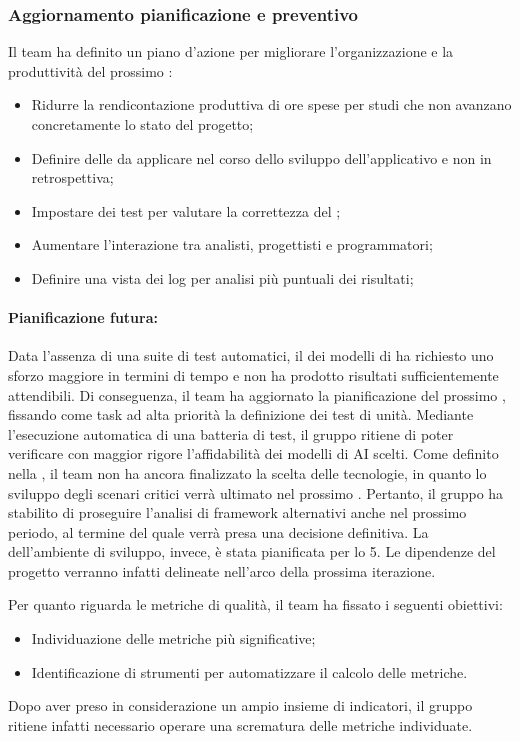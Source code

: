 \subsubsection{Aggiornamento pianificazione e preventivo}
\par Il team ha definito un piano d'azione per migliorare l'organizzazione e la produttività del prossimo :
\begin{itemize}
  \item Ridurre la rendicontazione produttiva di ore spese per studi che non avanzano concretamente lo stato del progetto;
  \item Definire delle  da applicare nel corso dello sviluppo dell'applicativo e non in retrospettiva;
  \item Impostare dei test per valutare la correttezza del ;
  \item Aumentare l'interazione tra analisti, progettisti e programmatori;
  \item Definire una vista dei log per analisi più puntuali dei risultati;
\end{itemize}

\paragraph*{Pianificazione futura:}
Data l'assenza di una suite di test automatici, il  dei modelli di  ha richiesto uno sforzo maggiore in termini di tempo e non ha prodotto risultati sufficientemente attendibili. Di conseguenza, il team ha aggiornato la pianificazione del prossimo , fissando come task ad alta priorità la definizione dei test di unità. Mediante l'esecuzione automatica di una batteria di test, il gruppo ritiene di poter verificare con maggior rigore l'affidabilità dei modelli di AI scelti. Come definito nella , il team non ha ancora finalizzato la scelta delle tecnologie, in quanto lo sviluppo degli scenari critici verrà ultimato nel prossimo . Pertanto, il gruppo ha stabilito di proseguire l'analisi di framework alternativi anche nel prossimo periodo, al termine del quale verrà presa una decisione definitiva. La  dell'ambiente di sviluppo, invece, è stata pianificata per lo  5. Le dipendenze del progetto verranno infatti delineate nell'arco della prossima iterazione.
\par Per quanto riguarda le metriche di qualità, il team ha fissato i seguenti obiettivi:
\begin{itemize}
  \item Individuazione delle metriche più significative;
  \item Identificazione di strumenti per automatizzare il calcolo delle metriche.
\end{itemize}
\par Dopo aver preso in considerazione un ampio insieme di indicatori, il gruppo ritiene infatti necessario operare una scrematura delle metriche individuate.

